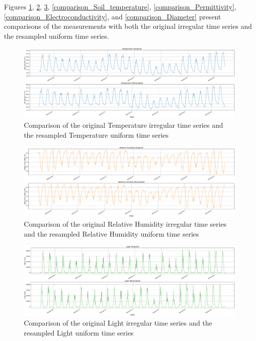 Figures \ref{comparison_Temperature}, \ref{comparison_Relative_humidity}, \ref{comparison_Light}, \ref{comparison_Soil_temperature}, \ref{comparison_Permittivity}, \ref{comparison_Electroconductivity}, and \ref{comparison_Diameter} present comparisons of the measurements with both the original irregular time series and the resampled uniform time series.


\begin{figure}[htbp]
    \centering
    \includegraphics[width=15 cm]{5_ChapterDesign/figuras/5_Irregular/comparison_Temperature.pdf}
    \caption{Comparison of the original Temperature irregular time series and the resampled Temperature uniform time series}
    \label{comparison_Temperature}
\end{figure}

\begin{figure}[htbp]
    \centering
    \includegraphics[width=15 cm]{5_ChapterDesign/figuras/5_Irregular/comparison_Relative_humidity.pdf}
    \caption{Comparison of the original Relative Humidity irregular time series and the resampled Relative Humidity uniform time series}
    \label{comparison_Relative_humidity}
\end{figure}

\begin{figure}[htbp]
    \centering
    \includegraphics[width=15 cm]{5_ChapterDesign/figuras/5_Irregular/comparison_Light.pdf}
    \caption{Comparison of the original Light irregular time series and the resampled Light uniform time series}
    \label{comparison_Light}
\end{figure}

